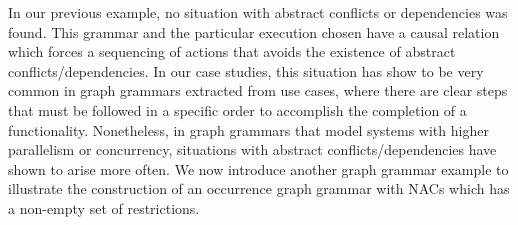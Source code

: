 

%
%    
%

  In our previous example, no situation with abstract conflicts or dependencies was found.
  This grammar and the particular execution chosen have a causal relation which forces a sequencing of actions that avoids the existence of abstract conflicts/dependencies.
  In our case studies, this situation has show to be very common in graph grammars extracted from use cases, where there are clear steps that must be followed in a specific order to accomplish the completion of a functionality.
  Nonetheless, in graph grammars that model systems with higher parallelism or concurrency, situations with abstract conflicts/dependencies have shown to arise more often. We now introduce another graph grammar example to illustrate the construction of an occurrence graph grammar with NACs which has a non-empty set of restrictions.

